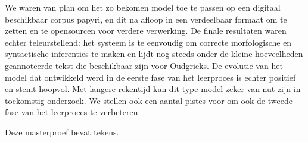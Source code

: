 We waren van plan om het zo bekomen model toe te passen op een
digitaal beschikbaar corpus papyri, en dit na afloop in een
verdeelbaar formaat om te zetten en te opensourcen voor verdere
verwerking. De finale resultaten waren echter teleurstellend: het
systeem is te eenvoudig om correcte morfologische en syntactische
inferenties te maken en lijdt nog steeds onder de kleine hoeveelheden
geannoteerde tekst die beschikbaar zijn voor Oudgrieks. De evolutie
van het model dat ontwikkeld werd in de eerste fase van het leerproces
is echter positief en stemt hoopvol. Met langere rekentijd kan dit
type model zeker van nut zijn in toekomstig onderzoek. We stellen ook
een aantal pistes voor om ook de tweede fase van het leerproces te
verbeteren.








\endgroup			

\vfill
Deze masterproef bevat \textbf{} tekens.

